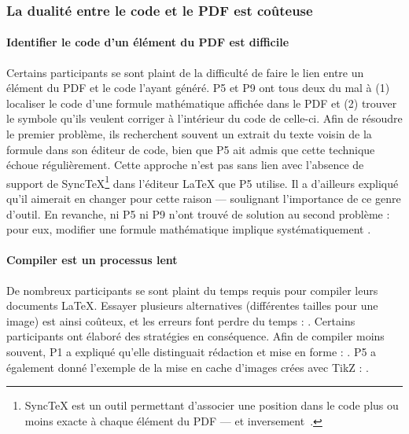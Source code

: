 \subsubsection{\printthemenumber{} La dualité entre le code et le PDF est coûteuse}

\paragraph{Identifier le code d'un élément du PDF est difficile}
Certains participants se sont plaint de la difficulté de faire le lien entre un élément du PDF et le code l'ayant généré.
P5 et P9 ont tous deux du mal à (1) localiser le code d'une formule mathématique affichée dans le PDF et (2) trouver le symbole qu'ils veulent corriger à l'intérieur du code de celle-ci.
Afin de résoudre le premier problème, ils recherchent souvent un extrait du texte voisin de la formule dans son éditeur de code, bien que P5 ait admis que cette technique échoue régulièrement.
Cette approche n'est pas sans lien avec l'absence de support de SyncTeX\footnote{SyncTeX est un outil permettant d'associer une position dans le code plus ou moins exacte à chaque élément du PDF --- et inversement~\cite{laurens2008direct}.} dans l'éditeur \LaTeX{} que P5 utilise.
Il a d'ailleurs expliqué qu'il aimerait en changer pour cette raison --- soulignant l'importance de ce genre d'outil.
En revanche, ni P5 ni P9 n'ont trouvé de solution au second problème : pour eux, modifier une formule mathématique implique systématiquement .

\paragraph{Compiler est un processus lent}
De nombreux participants se sont plaint du temps requis pour compiler leurs documents \LaTeX{}.
Essayer plusieurs alternatives (\eg différentes tailles pour une image) est ainsi coûteux, et les erreurs font perdre du temps : .
Certains participants ont élaboré des stratégies en conséquence.
Afin de compiler moins souvent, P1 a expliqué qu'elle distinguait rédaction et mise en forme : .
P5 a également donné l'exemple de la mise en cache d'images crées avec TikZ : .

